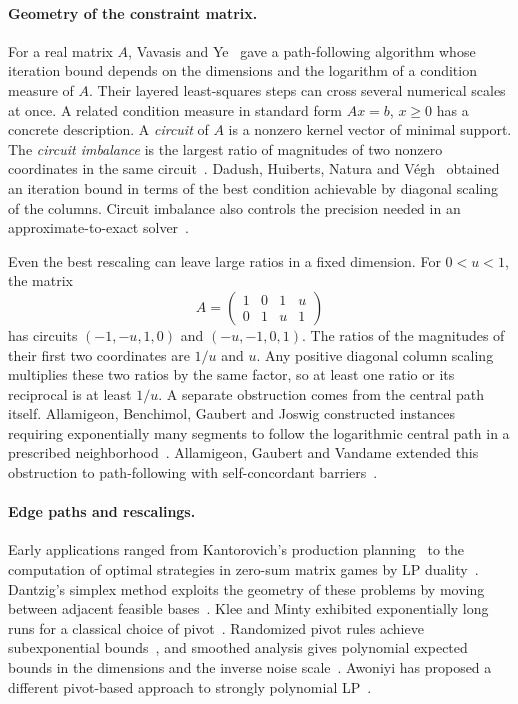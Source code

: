\paragraph{Geometry of the constraint matrix.}
For a real matrix $A$, Vavasis and Ye~\cite{VY} gave a path-following
algorithm whose iteration bound depends on the dimensions and the
logarithm of a condition measure of $A$. Their layered least-squares
steps can cross several numerical scales at once. A related condition
measure in standard form $Ax=b$, $x\ge0$ has a concrete description.
A \emph{circuit} of $A$ is a nonzero kernel vector of minimal support.
The \emph{circuit imbalance} is the largest ratio of magnitudes of
two nonzero coordinates in the same circuit~\cite{Rock,CIRC}.
Dadush, Huiberts, Natura and V\'egh~\cite{DHNV} obtained an iteration
bound in terms of the best condition achievable by diagonal scaling of
the columns. Circuit imbalance also controls the precision needed in
an approximate-to-exact solver~\cite{DNV}.

Even the best rescaling can leave large ratios in a fixed dimension.
For $0<u<1$, the matrix
\[
 A=\begin{pmatrix}1&0&1&u\\0&1&u&1\end{pmatrix}
\]
has circuits $(-1,-u,1,0)$ and $(-u,-1,0,1)$. The ratios of the
magnitudes of their first two coordinates are $1/u$ and $u$.
Any positive diagonal column scaling multiplies these two ratios by the
same factor, so at least one ratio or its reciprocal is at least $1/u$.
A separate obstruction comes from the central path itself. Allamigeon,
Benchimol, Gaubert and Joswig constructed instances requiring
exponentially many segments to follow the logarithmic central path
in a prescribed neighborhood~\cite{ABGJ}. Allamigeon, Gaubert and
Vandame extended this obstruction to path-following with
self-concordant barriers~\cite{AGV}.

\paragraph{Edge paths and rescalings.}
Early applications ranged from Kantorovich's production planning~\cite{Kan}
to the computation of optimal strategies in zero-sum matrix games by LP
duality~\cite{Gale}. Dantzig's simplex method exploits the geometry of these
problems by moving between adjacent feasible bases~\cite{Dantzig}.
Klee and Minty exhibited exponentially long runs for a classical
choice of pivot~\cite{KM}. Randomized pivot rules achieve
subexponential bounds~\cite{Kalai,MSW}, and smoothed analysis gives
polynomial expected bounds in the dimensions and the inverse noise
scale~\cite{ST,BH}. Awoniyi has proposed a different pivot-based
approach to strongly polynomial LP~\cite{Awon}.

